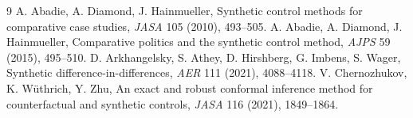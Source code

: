 \documentclass[11pt]{article}
\theoremstyle{definition}
\begin{document}
\begin{thebibliography}{9}
 A. Abadie, A. Diamond, J. Hainmueller, Synthetic control methods for comparative case studies, \emph{JASA} 105 (2010), 493--505.
 A. Abadie, A. Diamond, J. Hainmueller, Comparative politics and the synthetic control method, \emph{AJPS} 59 (2015), 495--510.
 D. Arkhangelsky, S. Athey, D. Hirshberg, G. Imbens, S. Wager, Synthetic difference-in-differences, \emph{AER} 111 (2021), 4088--4118.
 V. Chernozhukov, K. W\"uthrich, Y. Zhu, An exact and robust conformal inference method for counterfactual
and synthetic controls, \emph{JASA} 116 (2021), 1849--1864.
\end{thebibliography}
\end{document}
